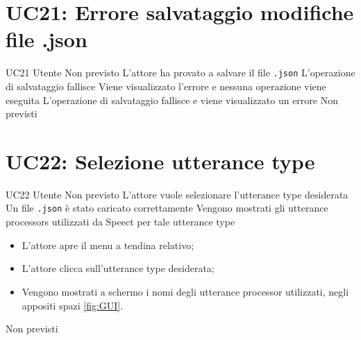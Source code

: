 \documentclass[../AnalisideiRequisiti.tex]{subfiles}
\begin{document}
\section{UC21: Errore salvataggio modifiche file .json}
\UserCase
{UC21}
{Utente}
{Non previsto}
{L'attore ha provato a salvare il file \verb|.json|}
{L'operazione di salvataggio fallisce}
{Viene visualizzato l'errore e nessuna operazione viene eseguita}
{L'operazione di salvataggio fallisce e viene visualizzato un errore}
{Non previsti}

\section{UC22: Selezione utterance type}
\UserCase
{UC22}
{Utente}
{Non previsto}
{L'attore vuole selezionare l'utterance type desiderata}
{Un file \verb|.json| è stato caricato correttamente }
{Vengono mostrati gli utterance processors utilizzati da Speect per tale utterance type}
{
	\begin{itemize}
		\item{} L'attore apre il menu a tendina relativo;
		\item{} L'attore clicca sull'utterance type desiderata;
		\item{} Vengono mostrati a schermo i nomi degli utterance processor utilizzati, negli appositi spazi \ref{fig:GUI}.
	\end{itemize}
}
{Non previsti}
\end{document}
